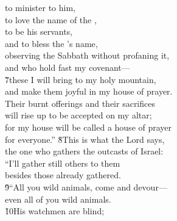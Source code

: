 \begin{poetry}
\poemll    to minister to him, \\
\poemlll       to love the name of the , \\
\poeml to be his servants, \\
\poemll    and to bless the 's name, \\
\poeml observing the Sabbath without profaning it, \\
\poemll    and who hold fast my covenant--- \\
\poeml \v{7}these I will bring to my holy mountain, \\
\poemll    and make them joyful in my house of prayer. \\
\poeml Their burnt offerings and their sacrifices \\
\poemll    will rise up to be accepted on my altar; \\
\poeml for my house will be called a house of prayer \\
\poemll    for everyone.''
\poeml \v{8}This is what the Lord  says, \\
\poemll    the one who gathers the outcasts of Israel: \\
\poeml ``I'll gather still others to them \\
\poemll    besides those already gathered. \\
\poeml \v{9}``All you wild animals, come and devour--- \\
\poemll    even all of you wild animals. \\
\poeml \v{10}His watchmen are blind; \\

\end{poetry}
